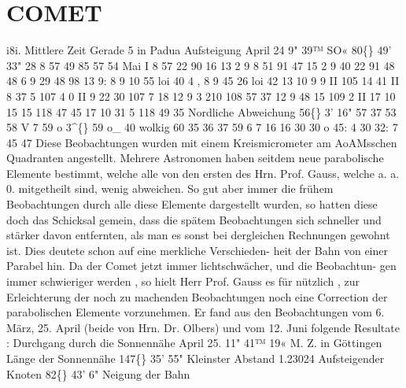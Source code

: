 \documentclass[12pt,a4paper]{article}
\newcommand{\degree}{\textdegree}
\begin{document}
\section*{COMET}
i8i. 
Mittlere  Zeit 
Gerade 
5 
in  Padua 
Aufsteigung 
April 
24 
9"  39™  SO« 
80\degree\{\}  49'    33" 
28 
8     57     49 
85     57     54 
Mai 
I 
8     57     22 
90     16     13 
2 
9       8     51 
91     47     15 
2 
9     40     22 
91     48     48 
6 
9     29     48 
98     13       9: 
8 
9     10     55 
loi     40       4 
, 
8 
9     45     26 
loi     42     13 
10 
9       9     II 
105     14     41 
II 
8     37       5 
107       4       0 
II 
9     22     30 
107       7     18 
12 
9       3     210 
108     57     37 
12 
9     48     15 
109       2     II 
17 
10     15     15 
118     47     45 
17 
10     31       5 
118     49     35 
Nordliche 
Abweichung 
56\degree\{\}     3'    16" 
57  37     53 
58  V       7 
59  o     3\textasciicircum\{\} 
59  o\_  40 
wolkig 
60  35     36 
37 
59 
6 
7 
16 
16 
30 
30 
o 
45: 
4 
30 
32: 
7 
45 
47 
Diese  Beobachtungen  wurden  mit  einem  Kreismicrometer   am  AoAMsschen  Quadranten  angestellt. 
Mehrere  Astronomen  haben  seitdem  neue  parabolische  Elemente  bestimmt,  welche  alle  von  den 
ersten  des  Hrn.  Prof.  Gauss,  welche  a.  a.  0.  mitgetheilt  sind,  wenig  abweichen.  So  gut  aber  immer 
die  frühem  Beobachtungen  durch  alle  diese  Elemente  dargestellt  wurden,  so  hatten  diese  doch  das 
Schicksal  gemein,  dass  die  spätem  Beobachtungen  sich  schneller  und  stärker  davon  entfernten,  als  man 
es  sonst  bei  dergleichen  Rechnungen  gewohnt  ist.  Dies  deutete  schon  auf  eine  merkliche  Verschieden- 
heit der  Bahn  von  einer  Parabel  hin.  Da  der  Comet  jetzt  immer  lichtschwächer,  und  die  Beobachtun- 
gen immer  schwieriger  werden ,  so  hielt  Herr  Prof.  Gauss  es  für  nützlich ,  zur  Erleichterung  der  noch 
zu  machenden  Beobachtungen  noch  eine  Correction  der  parabolischen  Elemente  vorzunehmen.  Er  fand 
aus  den  Beobachtungen  vom  6.  März,  25.  April  (beide  von  Hrn.  Dr.  Olbers)  und  vom  12.  Juni  folgende 
Resultate : 
Durchgang  durch  die  Sonnennähe  April  25.  11"  41™  19«  M.  Z.  in  Göttingen 
Länge  der  Sonnennähe   
147\degree\{\}  35'    55" 
Kleinster  Abstand   
1.23024 
Aufsteigender  Knoten   
82\degree\{\}  43'     6" 
Neigung  der  Bahn       
\end{document}
